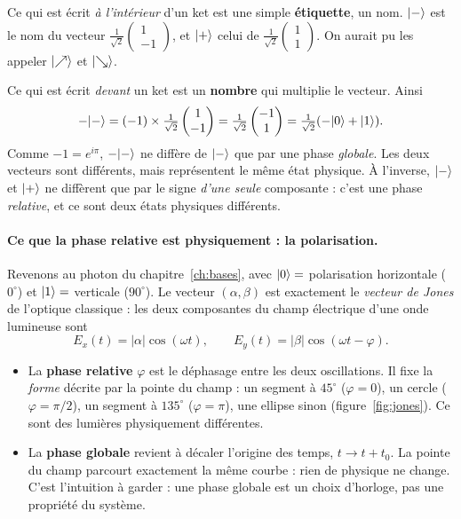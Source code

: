 \begin{piege}
Ce qui est écrit \emph{à l'intérieur} d'un ket est une simple \textbf{étiquette}, un nom. $\lvert -\rangle$ est le nom du vecteur $\tfrac1{\sqrt2}\begin{pmatrix}1\\-1\end{pmatrix}$, et $\lvert +\rangle$ celui de $\tfrac1{\sqrt2}\begin{pmatrix}1\\1\end{pmatrix}$. On aurait pu les appeler $\lvert \nearrow\rangle$ et $\lvert \searrow\rangle$.

Ce qui est écrit \emph{devant} un ket est un \textbf{nombre} qui multiplie le vecteur. Ainsi
\[
-\lvert -\rangle=(-1)\times\tfrac1{\sqrt2}\begin{pmatrix}1\\-1\end{pmatrix}=\tfrac1{\sqrt2}\begin{pmatrix}-1\\1\end{pmatrix}=\tfrac1{\sqrt2}(-\lvert 0\rangle+\lvert 1\rangle).
\]
Comme $-1=e^{i\pi}$, $-\lvert -\rangle$ ne diffère de $\lvert -\rangle$ que par une phase \emph{globale}. Les deux vecteurs sont différents, mais représentent le même état physique. À l'inverse, $\lvert -\rangle$ et $\lvert +\rangle$ ne diffèrent que par le signe \emph{d'une seule} composante : c'est une phase \emph{relative}, et ce sont deux états physiques différents.
\end{piege}

\paragraph{Ce que la phase relative est physiquement : la polarisation.} Revenons au photon du chapitre~\ref{ch:bases}, avec $\lvert 0\rangle=$ polarisation horizontale ($0^\circ$) et $\lvert 1\rangle=$ verticale ($90^\circ$). Le vecteur $(\alpha,\beta)$ est exactement le \emph{vecteur de Jones} de l'optique classique : les deux composantes du champ électrique d'une onde lumineuse sont
\[
E_x(t)=|\alpha|\cos(\omega t),\qquad E_y(t)=|\beta|\cos(\omega t-\varphi).
\]
\begin{itemize}
\item La \textbf{phase relative} $\varphi$ est le déphasage entre les deux oscillations. Il fixe la \emph{forme} décrite par la pointe du champ : un segment à $45^\circ$ ($\varphi=0$), un cercle ($\varphi=\pi/2$), un segment à $135^\circ$ ($\varphi=\pi$), une ellipse sinon (figure~\ref{fig:jones}). Ce sont des lumières physiquement différentes.
\item La \textbf{phase globale} revient à décaler l'origine des temps, $t\to t+t_0$. La pointe du champ parcourt exactement la même courbe : rien de physique ne change. C'est l'intuition à garder : une phase globale est un choix d'horloge, pas une propriété du système.
\end{itemize}

